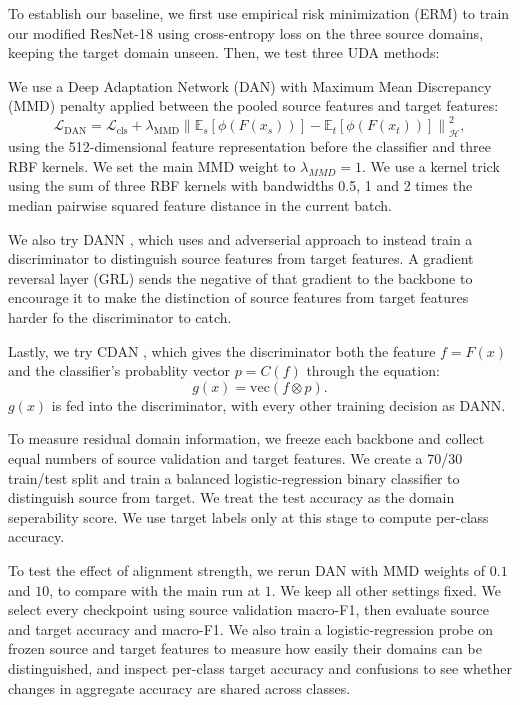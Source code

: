 \documentclass{article}
\begin{document}
To establish our baseline, we first use empirical risk minimization (ERM) to train our modified ResNet-18 using cross-entropy loss on the three source domains, keeping the target domain unseen. Then, we test three UDA methods:

We use a Deep Adaptation Network (DAN) \citep{long2015dan} with Maximum Mean Discrepancy (MMD) penalty applied between the pooled source features and target features:
\[\mathcal{L}_{\text{DAN}} = \mathcal{L}_{\text{cls}} + \lambda_{\text{MMD}} \left\| \mathbb{E}_{s}[\phi(F(x_{s}))] - \mathbb{E}_{t}[\phi(F(x_{t}))] \right\|_{\mathcal{H}}^{2},\]
using the 512-dimensional feature representation before the classifier and three RBF kernels. We set the main MMD weight to $\lambda_{MMD}=1$. We use a kernel trick using the sum of three RBF kernels with bandwidths 0.5, 1 and 2 times the median pairwise squared feature distance in the current batch.

We also try DANN \citep{ganin2016dann}, which uses and adverserial approach to instead train a discriminator to distinguish source features from target features. A gradient reversal layer (GRL) sends the negative of that gradient to the backbone to encourage it to make the distinction of source features from target features harder fo the discriminator to catch. 

Lastly, we try CDAN \citep{long2018cdan}, which gives the discriminator both the feature $f=F(x)$ and the classifier's probablity vector $p=C(f)$ through the equation:
\[g(x) = \text{vec} (f \otimes p).\]
$g(x)$ is fed into the discriminator, with every other training decision as DANN.

To measure residual domain information, we freeze each backbone and collect equal numbers of source validation and target features. We create a 70/30 train/test split and train a balanced logistic-regression binary classifier to distinguish source from target. We treat the test accuracy as the domain seperability score.  We use target labels only at this stage to compute per-class accuracy.

To test the effect of alignment strength, we rerun DAN with MMD weights of $0.1$ and $10$, to compare with the main run at $1$. We keep all other settings fixed. We select every checkpoint using source validation macro-F1, then evaluate source and target accuracy and macro-F1. We also train a logistic-regression probe on frozen source and target features to measure how easily their domains can be distinguished, and inspect per-class target accuracy and confusions to see whether changes in aggregate accuracy are shared across classes.
\end{document}
